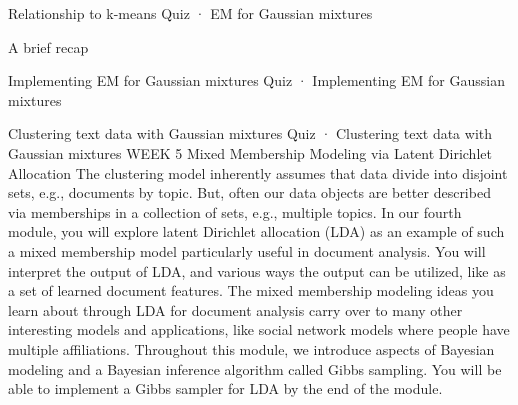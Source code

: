 \item Relationship to k-means
Quiz · EM for Gaussian mixtures
\item A brief recap
\item Implementing EM for Gaussian mixtures
Quiz · Implementing EM for Gaussian mixtures
\item Clustering text data with Gaussian mixtures
Quiz · Clustering text data with Gaussian mixtures
WEEK 5
Mixed Membership Modeling via Latent Dirichlet Allocation
The clustering model inherently assumes that data divide into disjoint sets, e.g., documents by topic. But, often our data objects are better described via memberships in a collection of sets, e.g., multiple topics. In our fourth module, you will explore latent Dirichlet allocation (LDA) as an example of such a mixed membership model particularly useful in document analysis. You will interpret the output of LDA, and various ways the output can be utilized, like as a set of learned document features. The mixed membership modeling ideas you learn about through LDA for document analysis carry over to many other interesting models and applications, like social network models where people have multiple affiliations.
Throughout this module, we introduce aspects of Bayesian modeling and a Bayesian inference algorithm called Gibbs sampling. You will be able to implement a Gibbs sampler for LDA by the end of the module.

